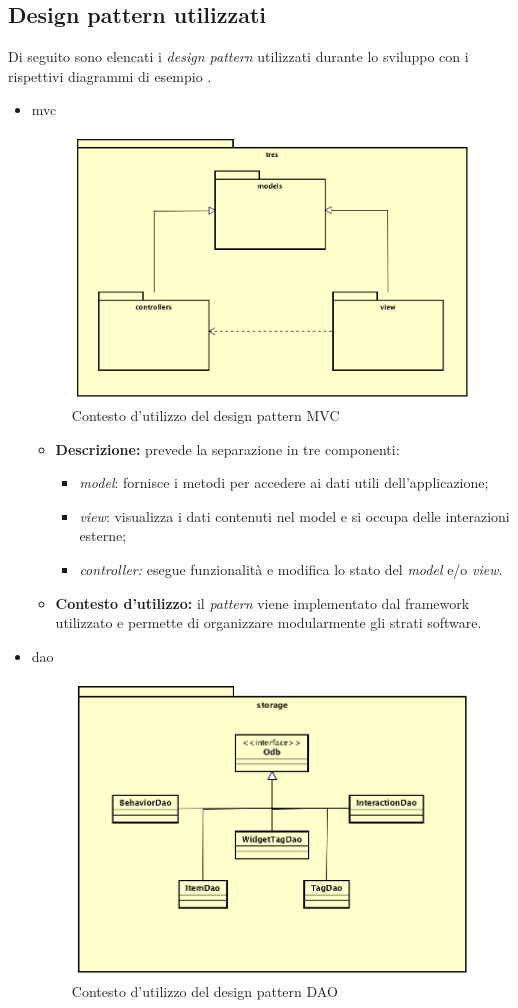 \subsection{Design pattern utilizzati}
Di seguito sono elencati i \textit{design pattern} utilizzati durante lo sviluppo con i rispettivi diagrammi di esempio .
\begin{itemize}
	\item \gls{mvc}
	\begin{figure}[h]
\centering
\includegraphics[width=0.5\linewidth]{immagini/esempioMVC}
\caption[Utilizzo del design pattern MVC]{Contesto d'utilizzo del design pattern MVC}
\label{fig:esempioMVC}
\end{figure}

	\begin{itemize}
		\item \textbf{Descrizione:} prevede la separazione in tre componenti:
		\begin{itemize}
			\item \textit{model}: fornisce i metodi per accedere ai dati utili dell'applicazione;
			\item \textit{view}: visualizza i dati contenuti nel model e si occupa delle interazioni esterne;
			\item \textit{controller:} esegue funzionalità e modifica lo stato del \textit{model} e/o \textit{view}.
		\end{itemize}
		\item \textbf{Contesto d'utilizzo:} il \textit{pattern} viene implementato dal \gls{framework} utilizzato e permette di organizzare modularmente gli strati software.
	\end{itemize}
	\item \gls{dao}
	\begin{figure}[h]
\centering
\includegraphics[width=0.5\linewidth]{immagini/tres-storage}
\caption[Utilizzo del design pattern DAO]{Contesto d'utilizzo del design pattern DAO}
\label{fig:tres-storage}
\end{figure}


\end{itemize}
